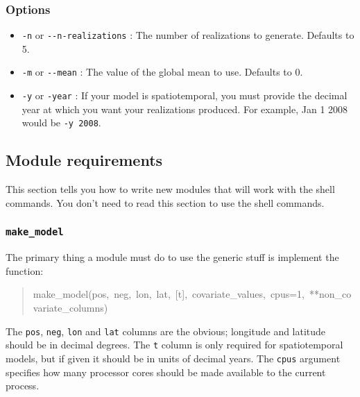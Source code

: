 


\subsubsection{Options}
\label{sec:id13}
\begin{itemize}
\item {} 
\texttt{-n} or \texttt{-{}-n-realizations} : The number of realizations to generate. Defaults to 5.

\item {} 
\texttt{-m} or \texttt{-{}-mean} : The value of the global mean to use. Defaults to 0.

\item {} 
\texttt{-y} or \texttt{-year} : If your model is spatiotemporal, you must provide the decimal year at
which you want your realizations produced. For example, Jan 1 2008 would be \texttt{-y 2008}.

\end{itemize}





\subsection{Module requirements}
\label{sec:module-requirements}

This section tells you how to write new modules that will work with the shell commands.
You don't need to read this section to use the shell commands.





\subsubsection{\texttt{make{\_}model}}
\label{sec:make-model}

The primary thing a module must do to use the generic stuff is implement the function:
\begin{quote}{\ttfamily \raggedright \noindent
make{\_}model(pos,~neg,~lon,~lat,~{[}t{]},~covariate{\_}values,~cpus=1,~**non{\_}covariate{\_}columns)
}\end{quote}

The \texttt{pos}, \texttt{neg}, \texttt{lon} and \texttt{lat} columns are the obvious; longitude and
latitude should be in decimal degrees. The \texttt{t} column is only required for
spatiotemporal models, but if given it should be in units of decimal years.
The \texttt{cpus} argument specifies how many processor cores should be made available to
the current process.

